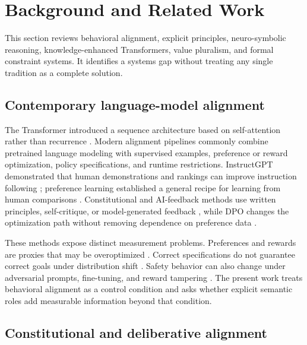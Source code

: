 \section{Background and Related Work}
\label{sec:background}

This section reviews behavioral alignment, explicit principles, neuro-symbolic reasoning, knowledge-enhanced Transformers, value pluralism, and formal constraint systems. It identifies a systems gap without treating any single tradition as a complete solution.

\subsection{Contemporary language-model alignment}

The Transformer introduced a sequence architecture based on self-attention rather than recurrence \citep{vaswani2017attention}. Modern alignment pipelines commonly combine pretrained language modeling with supervised examples, preference or reward optimization, policy specifications, and runtime restrictions. InstructGPT demonstrated that human demonstrations and rankings can improve instruction following \citep{ouyang2022instructgpt}; preference learning established a general recipe for learning from human comparisons \citep{christiano2017preferences}. Constitutional and AI-feedback methods use written principles, self-critique, or model-generated feedback \citep{bai2022constitutional,lee2023rlaif}, while DPO changes the optimization path without removing dependence on preference data \citep{rafailov2023dpo}.

These methods expose distinct measurement problems. Preferences and rewards are proxies that may be overoptimized \citep{gao2023overoptimization,kim2024proxy}. Correct specifications do not guarantee correct goals under distribution shift \citep{langosco2022goalmisgeneralization,shah2022goalmisgeneralization}. Safety behavior can also change under adversarial prompts, fine-tuning, and reward tampering \citep{wei2023jailbroken,qi2023finetuning,denison2024subterfuge}. The present work treats behavioral alignment as a control condition and asks whether explicit semantic roles add measurable information beyond that condition.

\subsection{Constitutional and deliberative alignment}


